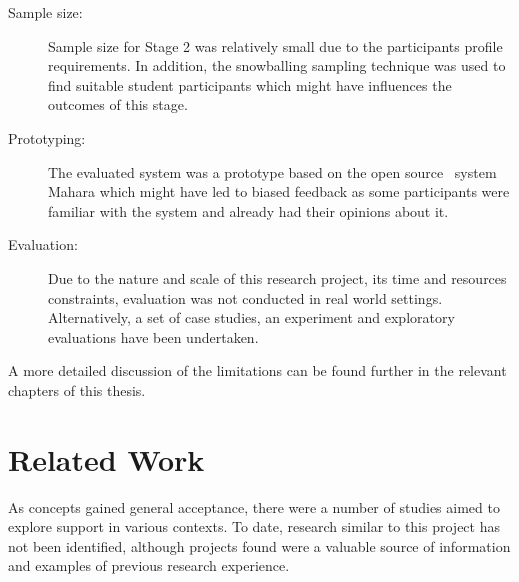 \begin{description}
\item[Sample size:] Sample size for Stage 2 was relatively small due to the
participants profile requirements. In addition, the snowballing sampling
technique was used to find suitable student participants which might have
influences the outcomes of this stage.
\item[Prototyping:] The evaluated system was a prototype based on the open
source \ep~system Mahara which might have led to biased feedback as some
participants were familiar with the system and already had their opinions about
it.
\item[Evaluation:] Due to the nature and scale of this research project, its
time and resources constraints, evaluation was not conducted in real world
settings. Alternatively, a set of case studies, an experiment and exploratory
evaluations have been undertaken.
\end{description}

A more detailed discussion of the limitations can be found further in the
relevant chapters of this thesis.

\section{Related Work}
\label{sec:related}
As \LLLs concepts gained general acceptance, there were a number of studies
aimed to explore \LLLs support in various contexts. To date, research similar to
this project has not been identified, although projects found were a valuable
source of information and examples of previous research experience.

